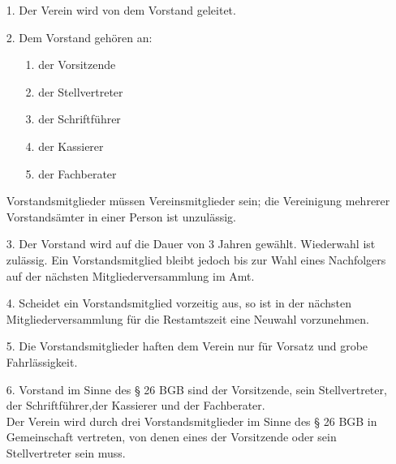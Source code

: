 \documentclass{scrartcl}
\begin{document}
\begin{itemize}
	\item[1.] Der Verein wird von dem Vorstand geleitet.
	\item[2.] Dem Vorstand gehören an:
		\begin{enumerate}
			\item[1.] der Vorsitzende
			\item[2.] der Stellvertreter
			\item[3.] der Schriftführer
			\item[4.] der Kassierer
			\item[5.] der Fachberater		 
		\end{enumerate}
		Vorstandsmitglieder müssen Vereinsmitglieder sein; die Vereinigung mehrerer
		Vorstandsämter in einer Person ist unzulässig.
	\item[3.] Der Vorstand wird auf die Dauer von 3 Jahren gewählt.
			  Wiederwahl ist zulässig. Ein Vorstandsmitglied bleibt jedoch bis zur Wahl
			  eines Nachfolgers auf der nächsten Mitgliederversammlung im Amt.
	\item[4.] Scheidet ein Vorstandsmitglied vorzeitig aus, so ist in der nächsten
			  Mitgliederversammlung für die Restamtszeit eine Neuwahl vorzunehmen.
	\item[5.] Die Vorstandsmitglieder haften dem Verein nur für Vorsatz und grobe
			  Fahrlässigkeit.
	\item[6.] Vorstand im Sinne des § 26 BGB sind der Vorsitzende, sein Stellvertreter,
			  der Schriftführer,der Kassierer und der Fachberater.\\
			  Der Verein wird durch drei Vorstandsmitglieder im Sinne des § 26 BGB in
			  Gemeinschaft vertreten, von denen eines der Vorsitzende oder sein
			  Stellvertreter sein muss.
\end{itemize}


\end{document}

